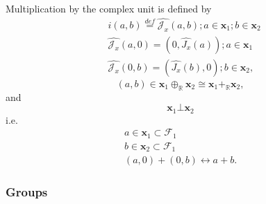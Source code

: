 \documentclass[aps,preprint]{revtex4}
\begin{document}
Multiplication by the complex unit is defined by 
\begin{align}
& i\left( a,b\right) \overset{def}{=}\widehat{\mathcal{J}_{x}}\left(
a,b\right) ;a\in\mathbf{x}_{1};b\in\mathbf{x}_{2} \\
& \widehat{\mathcal{J}_{x}}\left( a,0\right) =\left( 0,\widehat{J_{x}}\left(
a\right) \right) ;a\in\mathbf{x}_{1} \\
& \widehat{\mathcal{J}_{x}}\left( 0,b\right) =\left( \widehat{J_{x}}\left(
b\right) ,0\right) ;b\in\mathbf{x}_{2},
\end{align}%
\begin{equation}
\left( a,b\right) \in\mathbf{x}_{1}\oplus_{\mathbb{R}}\mathbf{x}_{2}\cong%
\mathbf{x}_{1}+_{\mathbb{R}}\mathbf{x}_{2},
\end{equation}
and 
\begin{equation}
\mathbf{x}_{1}\bot\mathbf{x}_{2}
\end{equation}
i.e. 
\begin{gather}
a\in\mathbf{x}_{1}\subset\mathcal{F}_{1} \\
b\in\mathbf{x}_{2}\subset\mathcal{F}_{1} \\
\left( a,0\right) +\left( 0,b\right) \leftrightarrow a+b.
\end{gather}

\subsubsection{Groups}
\end{document}
